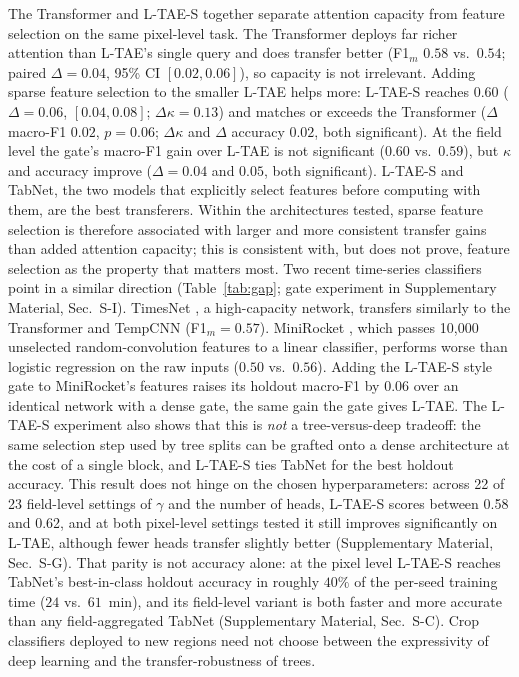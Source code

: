 \documentclass[preprint,authoryear]{elsarticle}
\begin{document}
The Transformer and L-TAE-S together separate attention capacity from feature selection on the same pixel-level task. The Transformer deploys far richer attention than L-TAE's single query and does transfer better (F1$_m$ $0.58$ vs.\ $0.54$; paired $\Delta=0.04$, 95\% CI $[0.02,0.06]$), so capacity is not irrelevant. Adding sparse feature selection to the smaller L-TAE helps more: L-TAE-S reaches $0.60$ ($\Delta=0.06$, $[0.04,0.08]$; $\Delta\kappa=0.13$) and matches or exceeds the Transformer ($\Delta$ macro-F1 $0.02$, $p=0.06$; $\Delta\kappa$ and $\Delta$ accuracy $0.02$, both significant). At the field level the gate's macro-F1 gain over L-TAE is not significant ($0.60$ vs.\ $0.59$), but $\kappa$ and accuracy improve ($\Delta=0.04$ and $0.05$, both significant). L-TAE-S and TabNet, the two models that explicitly select features before computing with them, are the best transferers. Within the architectures tested, sparse feature selection is therefore associated with larger and more consistent transfer gains than added attention capacity; this is consistent with, but does not prove, feature selection as the property that matters most. Two recent time-series classifiers point in a similar direction (Table~\ref{tab:gap}; gate experiment in Supplementary Material, Sec.~S-I). TimesNet \citep{timesnet2023}, a high-capacity network, transfers similarly to the Transformer and TempCNN (F1$_m=0.57$). MiniRocket \citep{minirocket2021}, which passes 10{,}000 unselected random-convolution features to a linear classifier, performs worse than logistic regression on the raw inputs ($0.50$ vs.\ $0.56$). Adding the L-TAE-S style gate to MiniRocket's features raises its holdout macro-F1 by $0.06$ over an identical network with a dense gate, the same gain the gate gives L-TAE. The L-TAE-S experiment also shows that this is \emph{not} a tree-versus-deep tradeoff: the same selection step used by tree splits can be grafted onto a dense architecture at the cost of a single block, and L-TAE-S ties TabNet for the best holdout accuracy. This result does not hinge on the chosen hyperparameters: across 22 of 23 field-level settings of $\gamma$ and the number of heads, L-TAE-S scores between 0.58 and 0.62, and at both pixel-level settings tested it still improves significantly on L-TAE, although fewer heads transfer slightly better (Supplementary Material, Sec.~S-G). That parity is not accuracy alone: at the pixel level L-TAE-S reaches TabNet's best-in-class holdout accuracy in roughly $40\%$ of the per-seed training time ($24$ vs.\ $61$~min), and its field-level variant is both faster and more accurate than any field-aggregated TabNet (Supplementary Material, Sec.~S-C). Crop classifiers deployed to new regions need not choose between the expressivity of deep learning and the transfer-robustness of trees.
\end{document}
